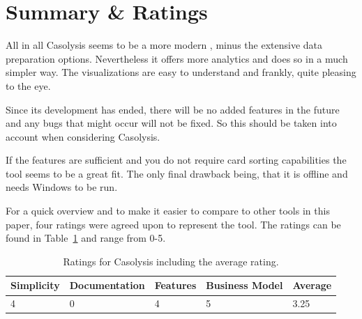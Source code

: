 \section{Summary \& Ratings}
All in all Casolysis seems to be a more modern \textcite{SynCaps},
minus the extensive data preparation options. Nevertheless it offers
more analytics and does so in a much simpler way. The visualizations
are easy to understand and frankly, quite pleasing to the eye.

Since its development has ended, there will be no added features in
the future and any bugs that might occur will not be fixed. So this
should be taken into account when considering Casolysis.

If the features are sufficient and you do not require card sorting
capabilities the tool seems to be a great fit. The only final drawback
being, that it is offline and needs Windows to be run.

For a quick overview and to make it easier to compare to other tools
in this paper, four ratings were agreed upon to represent the tool. The ratings can be
found in Table~\ref{tab:rating-Casolysis} and range from 0-5.


\begin{table}[tp] 
\centering 
\begin{tabularx}{\linewidth}{|X|X|X|X|X|}
\hline
Simplicity & Documentation & Features & Business Model & Average \\ 
\hline 
4 & 0 & 4 & 5 & 3.25 \\ 
\hline 
\end{tabularx} 
\caption[Ratings for Casolysis] {
Ratings for Casolysis including the average rating.
} 
\label{tab:rating-Casolysis}




\end{table}